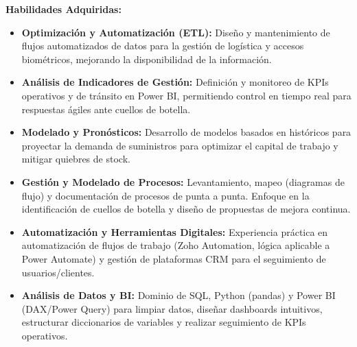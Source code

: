 \documentclass[10pt,a4paper]{altacv}
\begin{document}

\textbf{Habilidades Adquiridas:}
\vspace{-1mm}
\begin{justify}
\begin{itemize}
    \item \textbf{Optimización y Automatización (ETL):} Diseño y mantenimiento de flujos automatizados de datos para la gestión de logística y accesos biométricos, mejorando la disponibilidad de la información.
    \item \textbf{Análisis de Indicadores de Gestión:} Definición y monitoreo de KPIs operativos y de tránsito en Power BI, permitiendo control en tiempo real para respuestas ágiles ante cuellos de botella.
    \item \textbf{Modelado y Pronósticos:} Desarrollo de modelos basados en históricos para proyectar la demanda de suministros para optimizar el capital de trabajo y mitigar quiebres de stock.
\end{itemize}
\end{justify}

\vspace{-2mm}
\vspace{-3mm}
\begin{justify}
\begin{itemize}
     \item \textbf{Gestión y Modelado de Procesos:} Levantamiento, mapeo (diagramas de flujo) y documentación de procesos de punta a punta. Enfoque en la identificación de cuellos de botella y diseño de propuestas de mejora continua.
     \item \textbf{Automatización y Herramientas Digitales:} Experiencia práctica en automatización de flujos de trabajo (Zoho Automation, lógica aplicable a Power Automate) y gestión de plataformas CRM para el seguimiento de usuarios/clientes.
     \item \textbf{Análisis de Datos y BI:} Dominio de SQL, Python (pandas) y Power BI (DAX/Power Query) para limpiar datos, diseñar dashboards intuitivos, estructurar diccionarios de variables y realizar seguimiento de KPIs operativos.
\end{itemize}
\end{justify}

\end{document}
